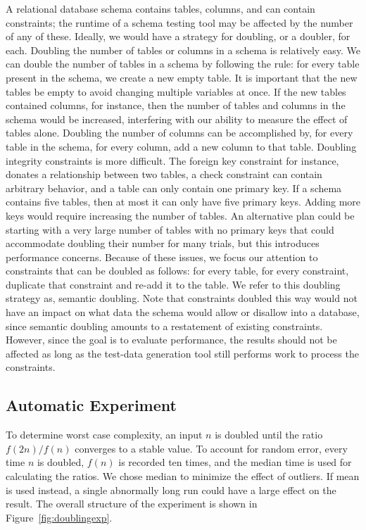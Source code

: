   A relational database schema contains tables, columns, and can contain
  constraints; the runtime of a schema testing tool may be affected by the
  number of any of these. Ideally, we would have a strategy for doubling,
  or a doubler, for each. Doubling the number of tables or columns in a
  schema is relatively easy.  We can double the number of tables in a schema
  by following the rule: for every table present in the schema, we create
  a new empty table. It is important that the new tables be empty to avoid
  changing multiple variables at once.  If the new tables contained
  columns, for instance, then the number of tables and columns in the schema
  would be increased, interfering with our ability to measure the effect of
  tables alone.  Doubling the number of columns can be accomplished by, for
  every table in the schema, for every column, add a new column to that table.
  Doubling integrity constraints is more difficult.  The foreign key
  constraint for instance, donates a relationship between two tables, a check
  constraint can contain arbitrary behavior, and a table can only contain one
  primary key.  If a schema contains five tables, then at most it can only
  have five primary keys.  Adding more keys would require increasing the
  number of tables.  An alternative plan could be starting with a very large
  number of tables with no primary keys that could accommodate doubling their
  number for many trials, but this introduces performance concerns.  Because
  of these issues, we focus our attention to constraints that can be doubled
  as follows: for every table, for every constraint, duplicate that
  constraint and re-add it to the table.  We refer to this doubling strategy
  as, semantic doubling.  Note that constraints doubled this way would not have
  an impact on what data the schema would allow or disallow into a database,
  since semantic doubling amounts to a restatement of existing constraints.
  However, since the goal is to evaluate performance, the results should not be
  affected as long as the test-data generation tool still performs work to
  process the constraints.


  \subsection{Automatic Experiment}
  \label{subsec:experiment}

  To determine worst case complexity, an input $n$ is doubled until the
  ratio $f(2n) / f(n)$ converges to a stable value. To account for random
  error, every time $n$ is doubled, $f(n)$ is recorded ten times, and the
  median time is used for calculating the ratios.  We chose
  median to minimize the effect of outliers. If mean is used instead, a
  single abnormally long run could have a large effect on the result. The
  overall structure of the experiment is shown in Figure~\ref{fig:doublingexp}.

